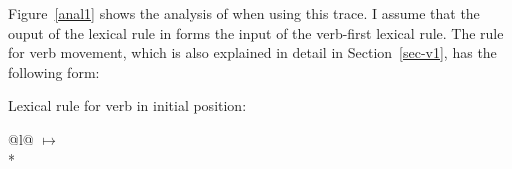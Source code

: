 Figure~\vref{anal1} shows the analysis of  when using this trace. I assume
that the ouput of the lexical rule in  forms the input of the verb-first lexical rule. The rule
for verb movement, which is also explained in detail in Section~\ref{sec-v1}, has the following
form:

\eas
\label{lr-verb-movement2-mf}
Lexical rule for verb in initial position:\\
\begin{tabular}[t]{@{}l@{}}
 $\mapsto$\\*
\end{tabular}
\zs



